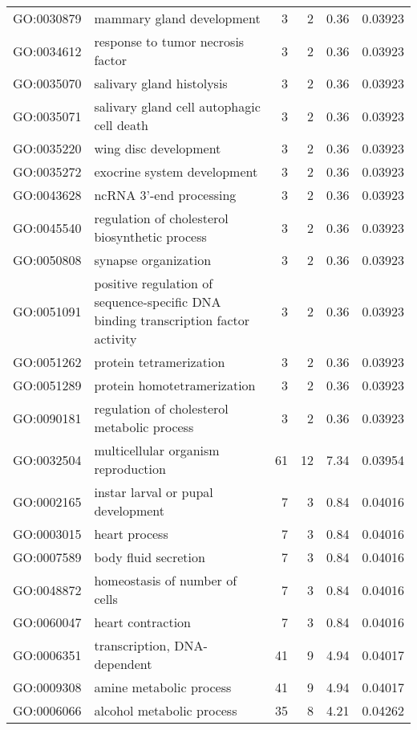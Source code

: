 \begin{longtable}{lp{4.5cm}rrrl}
  GO:0030879 & mammary gland development &   3 &   2 & 0.36 & 0.03923 \\ 
  GO:0034612 & response to tumor necrosis factor &   3 &   2 & 0.36 & 0.03923 \\ 
  GO:0035070 & salivary gland histolysis &   3 &   2 & 0.36 & 0.03923 \\ 
  GO:0035071 & salivary gland cell autophagic cell death &   3 &   2 & 0.36 & 0.03923 \\ 
  GO:0035220 & wing disc development &   3 &   2 & 0.36 & 0.03923 \\ 
  GO:0035272 & exocrine system development &   3 &   2 & 0.36 & 0.03923 \\ 
  GO:0043628 & ncRNA 3'-end processing &   3 &   2 & 0.36 & 0.03923 \\ 
  GO:0045540 & regulation of cholesterol biosynthetic process &   3 &   2 & 0.36 & 0.03923 \\ 
  GO:0050808 & synapse organization &   3 &   2 & 0.36 & 0.03923 \\ 
  GO:0051091 & positive regulation of sequence-specific DNA binding transcription factor activity &   3 &   2 & 0.36 & 0.03923 \\ 
  GO:0051262 & protein tetramerization &   3 &   2 & 0.36 & 0.03923 \\ 
  GO:0051289 & protein homotetramerization &   3 &   2 & 0.36 & 0.03923 \\ 
  GO:0090181 & regulation of cholesterol metabolic process &   3 &   2 & 0.36 & 0.03923 \\ 
  GO:0032504 & multicellular organism reproduction &  61 &  12 & 7.34 & 0.03954 \\ 
  GO:0002165 & instar larval or pupal development &   7 &   3 & 0.84 & 0.04016 \\ 
  GO:0003015 & heart process &   7 &   3 & 0.84 & 0.04016 \\ 
  GO:0007589 & body fluid secretion &   7 &   3 & 0.84 & 0.04016 \\ 
  GO:0048872 & homeostasis of number of cells &   7 &   3 & 0.84 & 0.04016 \\ 
  GO:0060047 & heart contraction &   7 &   3 & 0.84 & 0.04016 \\ 
  GO:0006351 & transcription, DNA-dependent &  41 &   9 & 4.94 & 0.04017 \\ 
  GO:0009308 & amine metabolic process &  41 &   9 & 4.94 & 0.04017 \\ 
  GO:0006066 & alcohol metabolic process &  35 &   8 & 4.21 & 0.04262 \\ 

\end{longtable}
